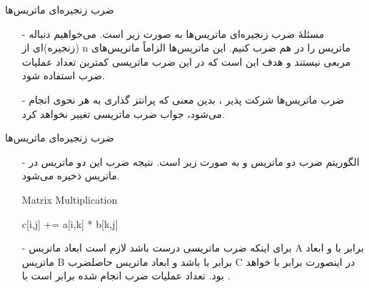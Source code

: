 \begin{frame}{‌ضرب زنجیره‌ای ماتریس‌ها}
\begin{itemize}\itemr
\item[-]
مسئلهٔ ضرب زنجیره‌ای ماتریس‌ها
 به صورت زیر است. می‌خواهیم دنباله (زنجیره)ای از n ماتریس
را در هم ضرب کنیم. این ماتریس‌ها الزاماً ماتریس‌های مربعی نیستند و هدف این است که در این ضرب ماتریسی کمترین تعداد عملیات ضرب استفاده شود.
\item[-]
ضرب ماتریس‌ها شرکت پذیر
، بدین معنی که پرانتز گذاری به هر نحوی انجام می‌شود، جواب ضرب ماتریسی تغییر نخواهد کرد.
\end{itemize}
\end{frame}


\begin{frame}{‌ضرب زنجیره‌ای ماتریس‌ها}
\begin{itemize}\itemr
\item[-]
الگوریتم ضرب دو ماتریس
و
به صورت زیر است. نتیجه ضرب این دو ماتریس در ماتریس
ذخیره می‌شود.
\begin{algorithm}[H]\alglr
  \caption{Matrix Multiplication} 
  \begin{algorithmic}[1]
      			\State c[i,j] += a[i,k] * b[k,j]
     		\EndFor
     	\EndFor     		      			
     \EndFor                            
  \end{algorithmic}
  \label{alg:merge}
\end{algorithm}
\item[-]
برای اینکه ضرب ماتریسی درست باشد لازم است ابعاد ماتریس A برابر با
و ابعاد ماتریس B برابر با
باشد و ابعاد ماتریس حاصلضرب C در اینصورت برابر با
خواهد بود. تعداد عملیات ضرب انجام شده برابر است با
.
\end{itemize}
\end{frame}


